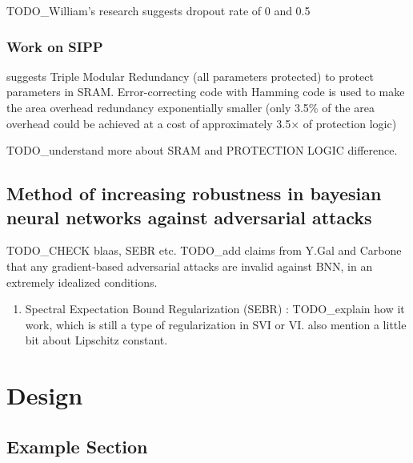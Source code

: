 \documentclass[ %
                    author={Revalda Putawara},
                supervisor={Dr. James Pope},
                    degree={MSc},
                     title={Robustness of Bayesian Neural Networks Design Choices Against Weight and Bias Perturbation Induced by Single Event Upsets (SEUs)},
                      type={},
                      year={2025}]{dissertation}
\begin{document}
TODO\_William's research suggests dropout rate of 0 and 0.5

\subsection{Work on SIPP}

\cite{yan_2020a} suggests Triple Modular Redundancy (all parameters protected) to protect parameters in SRAM. Error-correcting code with Hamming code is used to make the area overhead redundancy exponentially smaller (only 3.5\% of the area overhead could be achieved at a cost of approximately 3.5× of protection logic)

TODO\_understand more about SRAM and PROTECTION LOGIC difference.

\cite{yan_2020a}

\section{Method of increasing robustness in bayesian neural networks against adversarial attacks}

TODO\_CHECK blaas, SEBR etc.
TODO\_add claims from Y.Gal and Carbone that any gradient-based adversarial attacks are invalid against BNN, in an extremely idealized conditions.

\begin{enumerate}
\item Spectral Expectation Bound Regularization (SEBR) : \cite{zhang2021a} TODO\_explain how it work, which is still a type of regularization in SVI or VI. also mention a little bit about Lipschitz constant.
\end{enumerate}
\fi


\chapter{Design}
\label{chap:design}

\vspace{1cm} 
\iffalse

\section{Example Section}
\end{document}
